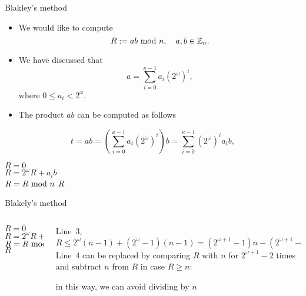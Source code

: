 \begin{frame}{Blakley's method}
\begin{itemize}
\item We would like to compute
\[
R:=ab\textrm{~mod~} n,\quad a,b\in{\mathbb Z}_n.
\]
\item We have discussed that
\begin{equation*}
a=\sum_{i=0}^{\kappa-1}a_i(2^\omega)^i,
\end{equation*}
where $0\leq a_i< 2^{\omega}$.
 \item The product $ab$ can be computed as follows
\end{itemize}
\[
t=ab=\left(\sum_{i=0}^{\kappa-1} a_i(2^\omega)^i\right)b=\sum_{i=0}^{\kappa-1}(2^\omega)^ia_ib,
\]
\end{frame}

\begin{frame}{}
    \begin{algorithm}[H]
$R=0$\\
 	{
 	$R=2^{\omega}R+a_ib$\\
        $R=R\textrm{~mod~} n$
  	}
  	\Return $R$
	\caption{Blakely's method for computing modular multiplication.}
\end{algorithm}
\end{frame}

\begin{frame}{Blakely's method}
\begin{columns}[T] %
\begin{column}{.4\textwidth}
{
\setlength{\interspacetitleruled}{0pt}%
\setlength{\algotitleheightrule}{0pt}%
\begin{algorithm}[H]
$R=0$\\
 	{
 	$R=2^{\omega}R+a_ib$\\
        $R=R\textrm{~mod~} n$
  	}
  	\Return $R$
\end{algorithm}
}
\end{column}%
\hfill%
\begin{column}{.6\textwidth}
Line~3,
\[
R\leq 2^{\omega}(n-1)+(2^{\omega}-1)(n-1)=(2^{\omega+1}-1)n-(2^{\omega+1}-1)<(2^{\omega+1}-1)n.
\]
Line~4 can be replaced by comparing $R$ with $n$ for $2^{\omega+1}-2$ times and subtract $n$ from $R$ in case $R\geq n$:
{
\setlength{\interspacetitleruled}{0pt}%
\setlength{\algotitleheightrule}{0pt}%
\begin{algorithm}[H]
\DontPrintSemicolon
\end{algorithm}
}
in this way, we can avoid dividing by $n$
\end{column}%
\end{columns}
\end{frame}


